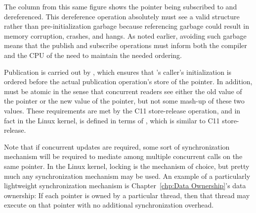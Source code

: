 The  column from this same figure shows
the pointer being subscribed to and dereferenced.
This dereference operation absolutely must see a valid 
structure rather than pre-initialization garbage because referencing
garbage could result in memory corruption, crashes, and hangs.
As noted earlier, avoiding such garbage means that the publish and
subscribe operations must inform both the compiler and the CPU of the
need to maintain the needed ordering.

Publication is carried out by , which ensures that
's caller's initialization is ordered before the actual
publication operation's store of the pointer.
In addition,  must be atomic in the sense that 
concurrent readers see either the old value of the pointer or the new
value of the pointer, but not some mash-up of these two values.
These requirements are met by the C11 store-release operation, and in
fact in the Linux kernel,  is defined in terms
of , which is similar to C11 store-release.

Note that if concurrent updates are required, some sort of synchronization
mechanism will be required to mediate among multiple concurrent
 calls on the same pointer.
In the Linux kernel, locking is the mechanism of choice, but pretty
much any synchronization mechanism may be used.
An example of a particularly lightweight synchronization mechanism is
Chapter~\ref{chp:Data Ownership}'s data ownership: If each pointer is
owned by a particular thread, then that thread may execute
 on that pointer with no additional
synchronization overhead.

\QuickQuizEnd


